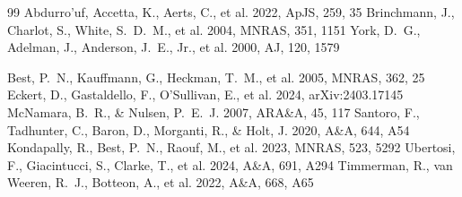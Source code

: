 \documentclass[twocolumn]{aastex702}
\begin{document}
\begin{thebibliography}{99}
 Abdurro'uf, Accetta, K., Aerts, C., et al. 2022, ApJS, 259, 35
 Brinchmann, J., Charlot, S., White, S.~D.~M., et al. 2004, MNRAS, 351, 1151
 York, D.~G., Adelman, J., Anderson, J.~E., Jr., et al. 2000, AJ, 120, 1579

 Best, P.~N., Kauffmann, G., Heckman, T.~M., et al. 2005, MNRAS, 362, 25
 Eckert, D., Gastaldello, F., O'Sullivan, E., et al. 2024, arXiv:2403.17145
 McNamara, B.~R., \& Nulsen, P.~E.~J. 2007, ARA\&A, 45, 117
 Santoro, F., Tadhunter, C., Baron, D., Morganti, R., \& Holt, J. 2020, A\&A, 644, A54
 Kondapally, R., Best, P.~N., Raouf, M., et al. 2023, MNRAS, 523, 5292
 Ubertosi, F., Giacintucci, S., Clarke, T., et al. 2024, A\&A, 691, A294
 Timmerman, R., van Weeren, R.~J., Botteon, A., et al. 2022, A\&A, 668, A65
\end{thebibliography}
\end{document}
